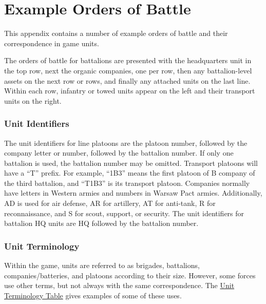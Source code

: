 



\onecolumn
\chapter{Example Orders of Battle}
\raggedbottom

This appendix contains a number of example orders of battle and their correspondence in game units.

The orders of battle for battalions are presented with the headquarters unit in the top row,
next the organic companies, one per row,
then any battalion-level assets on the next row or rows, and finally any attached units on the last line.
Within each row, infantry or towed units appear on the left and their transport units on the right.

\subsection{Unit Identifiers}
The unit identifiers for line platoons are the platoon number, followed by the company letter or number, followed by the battalion number. If only one battalion is used, the battalion number may be omitted. Transport platoons will have a “T” prefix. For example, “1B3” means the first platoon of B company of the third battalion, and “T1B3” is its transport platoon. Companies normally have letters in Western armies and numbers in Warsaw Pact armies. Additionally, AD is used for air defense, AR for artillery, AT for anti-tank, R for reconnaissance, and S for scout, support, or security. The unit identifiers for battalion HQ units are HQ followed by the battalion number.

\subsection{Unit Terminology}
Within the game, units are referred to as brigades, battalions, companies/batteries, and platoons according to their size. However, some forces use other terms, but not always with the same correspondence. The \hyperlink{table:unit-terminology-table}{Unit Terminology Table} gives examples of some of these uses.

